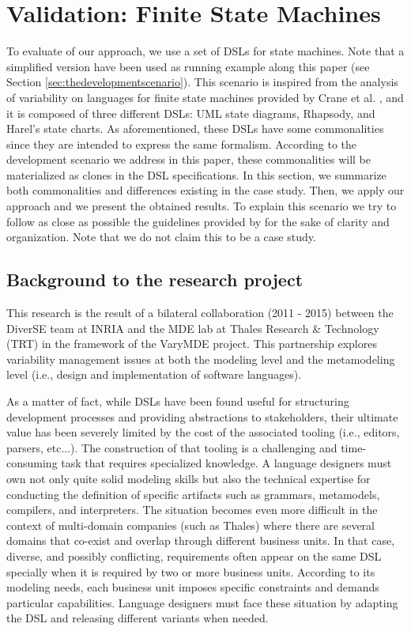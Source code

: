 \section{Validation: Finite State Machines}
\label{sec:validation}

 To evaluate of our approach, we use a set of DSLs for state machines. Note that a simplified version have been used as running example along this paper (see Section \ref{sec:thedevelopmentscenario}). This scenario is inspired from the analysis of variability on languages for finite state machines provided by Crane et al. \cite{Crane:2007}, and it is composed of three different DSLs: UML state diagrams, Rhapsody, and Harel's state charts. As aforementioned, these DSLs have some commonalities since they are intended to express the same formalism. According to the development scenario we address in this paper, these commonalities will be materialized as clones in the DSL specifications. In this section, we summarize both commonalities and differences existing in the case study. Then, we apply our approach and we present the obtained results. To explain this scenario we try to follow as close as possible the guidelines provided by \cite{runeson-book} for the sake of clarity and organization. Note that we do not claim this to be a case study.

\subsection{Background to the research project}
This research is the result of a bilateral collaboration (2011 - 2015) between the DiverSE team at INRIA and the MDE lab at Thales Research \& Technology (TRT) in the framework of the VaryMDE project. This partnership explores variability management issues at both the modeling level and the metamodeling level (i.e., design and implementation of software languages).

As a matter of fact, while DSLs have been found useful for structuring development processes and providing abstractions to stakeholders, their ultimate value has been severely limited by the cost of the associated tooling (i.e., editors, parsers, etc...). The construction of that tooling is a challenging and time-consuming task that requires specialized knowledge. A language designers must own not only quite solid modeling skills but also the technical expertise for conducting the definition of specific artifacts such as grammars, metamodels, compilers, and interpreters. The situation becomes even more difficult in the context of multi-domain companies (such as Thales) where there are several domains that co-exist and overlap through different business units. In that case, diverse, and possibly conflicting, requirements often appear on the same DSL specially when it is required by two or more business units. According to its modeling needs, each business unit imposes specific constraints and demands particular capabilities. Language designers must face these situation by adapting the DSL and releasing different variants when needed.

